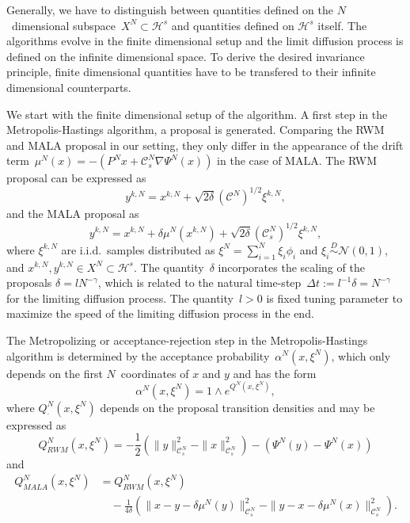 Generally, we have to distinguish between quantities defined on the $N$~dimensional subspace~$X^N \subset \mathcal{H}^s$ and quantities defined on $\mathcal{H}^s$ itself. The algorithms evolve in the finite dimensional setup and the limit diffusion process is defined on the infinite dimensional space. To derive the desired invariance principle, finite dimensional quantities have to be transfered to their infinite dimensional counterparts.

We start with the finite dimensional setup of the algorithm. A first step in the Metropolis-Hastings algorithm, a proposal is generated. Comparing the RWM and MALA proposal in our setting, they only differ in the appearance of the drift term~$\mu^{N}(x) = - (P^{N}x + \mathcal{C}_s^{N} \nabla \Psi^{N}(x))$ in the case of MALA. The RWM proposal can be expressed as
\begin{equation}
\label{DLR-RWM-proposal short}
 y^{k,N} = x^{k,N} + \sqrt{2 \delta} (\mathcal{C}^{N})^{1/2} \xi^{k,N},
\end{equation}
and the MALA proposal as
\begin{equation}
\label{DLR- MALA-proposal short}
 y^{k,N} = x^{k,N} + \delta \mu^{N}(x^{k,N}) + \sqrt{2 \delta} (\mathcal{C}_s^{N})^{1/2} \xi^{k,N},
\end{equation}
where $\xi^{k,N}$ are i.i.d.\, samples distributed as $\xi^{N} = \sum_{i=1}^{N} \xi_i \phi_i$ and $\xi_i \stackrel{D}{\sim} \mathcal{N}(0,1)$, and $x^{k,N}, y^{k,N} \in X^{N} \subset \mathcal{H}^s$. The quantity~$\delta$  incorporates the scaling of the proposals $ \delta = l N^{-\gamma} $, which is related to the natural time-step~$\Delta t := l^{-1} \delta = N^{ - \gamma}$ for the limiting diffusion process. The quantity~$l > 0$ is fixed tuning parameter to maximize the speed of the limiting diffusion process in the end.

The Metropolizing or acceptance-rejection step in the Metropolis-Hastings algorithm is determined by the acceptance probability~$\alpha^{N}(x, \xi^{N})$, which only depends on the first $N$~coordinates of $x$ and $y$ and has the form
\begin{equation}
 \label{DLR-acceptance probability short}
 \alpha^{N} (x, \xi^{N}) = 1 \wedge e^{Q^{N}_{\cdot}(x, \xi^{N})},
\end{equation}
where $Q^{N}_{\cdot}(x, \xi^{N})$ depends on the proposal transition densities and may be expressed as
\begin{equation}
 \label{DLR-Q RWM short}
 Q_{RWM}^{N}(x, \xi^{N}) = - \frac{1}{2} \left(\| y \|_{\mathcal{C}_s^N}^2 - \| x \|_{\mathcal{C}_s^N}^2\right) - \left( \Psi^N(y) - \Psi^N(x) \right)
\end{equation}
and 
\begin{equation}
 \label{DLR-Q MALA short}
 \begin{split}
  Q_{MALA}^{N}(x, \xi^{N}) & = Q_{RWM}^{N}(x, \xi^{N}) \\
  & \quad - \frac{1}{4 \delta} \left( \| x - y - \delta \mu^N(y) \|_{\mathcal{C}_s^N}^2 -  \| y - x - \delta \mu^N(x) \|_{\mathcal{C}_s^N}^2 \right).
 \end{split}
\end{equation}

